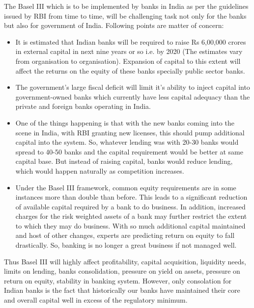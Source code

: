 \documentclass[11pt]{article}
\numberwithin{equation}{section}
\begin{document}
The Basel III which is to be implemented by banks in India as per the guidelines issued by RBI from time to time, will be challenging task not only for the banks but also for government of India. Following points are matter of concern: 
\begin{itemize}
\item It is estimated that Indian banks will be required to raise Rs 6,00,000 crores in external capital in next nine years or so i.e. by 2020 (The estimates vary from organisation to organisation). Expansion of capital to this extent will affect the returns on the equity of these banks specially public sector banks. 

\item The government's large fiscal deficit will limit it's ability to inject capital into government-owned banks which currently have less capital adequacy than the private and foreign banks operating in India.

\item One of the things happening is that with the new banks coming into the scene in India, with RBI granting new licenses, this should pump additional capital into the system. So, whatever lending was with 20-30 banks would spread to 40-50 banks and the capital requirement would be better at same capital base. But instead of raising capital, banks would reduce lending, which would happen naturally as competition increases.

\item  Under the Basel III framework, common equity requirements are in some instances more than double than before.  This leads to a significant reduction of available capital required by a bank to do business. In addition, increased charges for the risk weighted assets of a bank may further restrict the extent to which they may do business. With so much additional capital maintained and host of other changes, experts are predicting return on equity to fall drastically. So, banking is no longer a great business if not managed well.

\end{itemize} 
 Thus Basel III will highly affect profitability, capital acquisition, liquidity needs, limits on lending, banks consolidation, pressure on yield on assets, pressure on return on equity, stability in banking system. However, only consolation for Indian banks is the fact that historically our banks have maintained their core and overall capital well in excess of the regulatory minimum.
\end{document}
